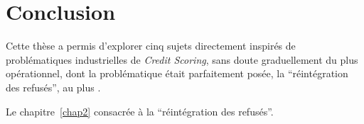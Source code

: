 \chapter*{Conclusion}


Cette thèse a permis d'explorer cinq sujets directement inspirés de problématiques industrielles de \textit{Credit Scoring}, sans doute graduellement du plus opérationnel, dont la problématique était parfaitement posée, la ``réintégration des refusés'', au plus .

Le chapitre~\ref{chap2} consacrée à la ``réintégration des refusés''.